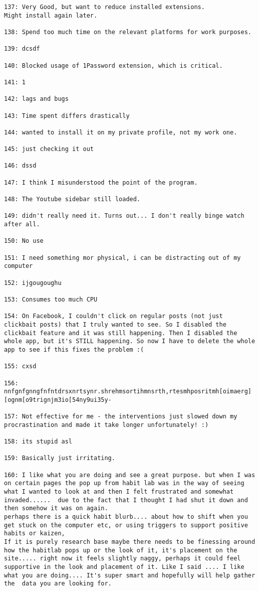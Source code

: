 \begin{lstlisting}[breaklines]
137: Very Good, but want to reduce installed extensions.
Might install again later.

138: Spend too much time on the relevant platforms for work purposes.

139: dcsdf

140: Blocked usage of 1Password extension, which is critical.

141: 1

142: lags and bugs

143: Time spent differs drastically

144: wanted to install it on my private profile, not my work one.

145: just checking it out

146: dssd

147: I think I misunderstood the point of the program.

148: The Youtube sidebar still loaded.

149: didn't really need it. Turns out... I don't really binge watch after all.

150: No use

151: I need something mor physical, i can be distracting out of my computer

152: ijgougoughu

153: Consumes too much CPU

154: On Facebook, I couldn't click on regular posts (not just clickbait posts) that I truly wanted to see. So I disabled the clickbait feature and it was still happening. Then I disabled the whole app, but it's STILL happening. So now I have to delete the whole app to see if this fixes the problem :(

155: cxsd

156: nnfgnfgnngfnfntdrsxnrtsynr.shrehmsortihmnsrth,rtesmhposritmh[oimaerg][ognm[o9trignjm3io[54ny9ui35y-

157: Not effective for me - the interventions just slowed down my procrastination and made it take longer unfortunately! :)

158: its stupid asl

159: Basically just irritating.

160: I like what you are doing and see a great purpose. but when I was on certain pages the pop up from habit lab was in the way of seeing what I wanted to look at and then I felt frustrated and somewhat invaded......  due to the fact that I thought I had shut it down and then somehow it was on again. 
perhaps there is a quick habit blurb.... about how to shift when you get stuck on the computer etc, or using triggers to support positive habits or kaizen, 
If it is purely research base maybe there needs to be finessing around how the habitlab pops up or the look of it, it's placement on the site..... right now it feels slightly naggy, perhaps it could feel supportive in the look and placement of it. Like I said .... I like what you are doing.... It's super smart and hopefully will help gather  the  data you are looking for.


\end{lstlisting}

